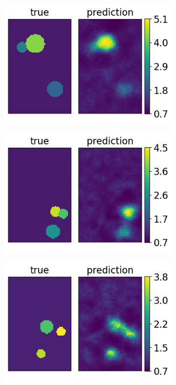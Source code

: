 \documentclass[12pt]{article}
\newcommand{\nhgappwidth}{0.24\linewidth}
\newcommand{\nhgappheight}{2.9cm}
\begin{document}
\begin{appendices}
\begin{figure}[!h]
\begin{subfigure}[c]{\nhgappwidth}
  \end{subfigure}
  \begin{subfigure}[c]{\nhgappwidth}
    \centering    
    \includegraphics[totalheight=\nhgappheight]{Figures/AppendixNew/CNN1/ex10/mu.png}
  \end{subfigure}
  \begin{subfigure}[c]{\nhgappwidth}
    \centering
    \includegraphics[totalheight=\nhgappheight]{Figures/AppendixNew/CNN1/ex11/mu.png}
  \end{subfigure}
  \begin{subfigure}[c]{\nhgappwidth}
    \centering
    \includegraphics[totalheight=\nhgappheight]{Figures/AppendixNew/CNN1/ex12/mu.png}

\end{subfigure}
\end{figure}
\end{appendices}
\end{document}
